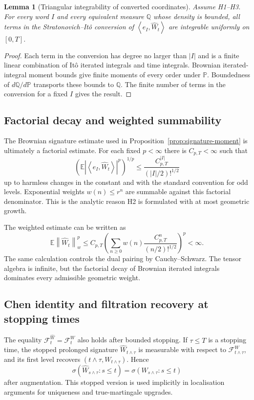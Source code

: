 \documentclass[11pt,oneside]{article}
\theoremstyle{plain}
\newtheorem{lemma}[theorem]{Lemma}
\theoremstyle{definition}
\theoremstyle{remark}
\newcommand{\E}{\mathbb{E}}
\newcommand{\Q}{\mathbb{Q}}
\newcommand{\Pp}{\mathbb{P}}
\newcommand{\cW}{\widehat W}
\newcommand{\FWh}{\mathcal F^{\widehat W}}
\newcommand{\FW}{\mathcal F^W}
\newcommand{\norm}[1]{\left\lVert #1\right\rVert}
\newcommand{\abs}[1]{\left\lvert #1\right\rvert}
\newcommand{\inner}[2]{\left\langle #1,#2\right\rangle}
\begin{document}
\begin{lemma}[Triangular integrability of converted coordinates]
\label{lem:triangular-conversion-integrability}
Assume H1--H3. For every word $I$ and every equivalent measure $\Q$ whose density is bounded, all terms in the Stratonovich--It\^o conversion of $\inner{e_I}{\cW_t}$ are integrable uniformly on $[0,T]$.
\end{lemma}

\begin{proof}
Each term in the conversion has degree no larger than $|I|$ and is a finite linear combination of It\^o iterated integrals and time integrals. Brownian iterated-integral moment bounds give finite moments of every order under $\Pp$. Boundedness of $d\Q/d\Pp$ transports these bounds to $\Q$. The finite number of terms in the conversion for a fixed $I$ gives the result.
\end{proof}

\subsection*{Factorial decay and weighted summability}
The Brownian signature estimate used in Proposition~\ref{prop:signature-moment} is ultimately a factorial estimate. For each fixed $p<\infty$ there is $C_{p,T}<\infty$ such that
\[
\left(\E\abs{\inner{e_I}{\cW_t}}^p\right)^{1/p}
\leq \frac{C_{p,T}^{|I|}}{(|I|/2)!^{1/2}}
\]
up to harmless changes in the constant and with the standard convention for odd levels. Exponential weights $w(n)\leq r^n$ are summable against this factorial denominator. This is the analytic reason H2 is formulated with at most geometric growth.

The weighted estimate can be written as
\[
\E\norm{\cW_t}_w^p
\leq C_{p,T}\left(\sum_{n\geq0} w(n)\frac{C_{p,T}^n}{(n/2)!^{1/2}}\right)^p<\infty .
\]
The same calculation controls the dual pairing by Cauchy--Schwarz. The tensor algebra is infinite, but the factorial decay of Brownian iterated integrals dominates every admissible geometric weight.



\subsection*{Chen identity and filtration recovery at stopping times}
The equality $\FWh_t=\FW_t$ also holds after bounded stopping. If $\tau\leq T$ is a stopping time, the stopped prolonged signature $\cW_{t\wedge\tau}$ is measurable with respect to $\FW_{t\wedge\tau}$, and its first level recovers $(t\wedge\tau,W_{t\wedge\tau})$. Hence
\[
\sigma(\cW_{s\wedge\tau}:s\leq t)=\sigma(W_{s\wedge\tau}:s\leq t)
\]
after augmentation. This stopped version is used implicitly in localisation arguments for uniqueness and true-martingale upgrades.
\end{document}
